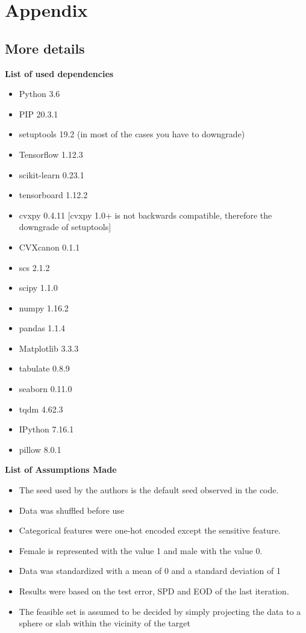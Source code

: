 \newpage
\section*{Appendix}
\subsection*{More details}

\textbf{List of used dependencies}
\begin{itemize}
    \item Python 3.6
    \item PIP 20.3.1
    \item setuptools 19.2 (in most of the cases you have to downgrade)
    \item Tensorflow 1.12.3
    \item scikit-learn 0.23.1
    \item tensorboard 1.12.2
    \item cvxpy 0.4.11 [cvxpy 1.0+ is not backwards compatible, therefore the downgrade of setuptools]
    \item CVXcanon 0.1.1
    \item scs 2.1.2
    \item scipy 1.1.0
    \item numpy 1.16.2
    \item pandas 1.1.4
    \item Matplotlib 3.3.3
    \item tabulate 0.8.9
    \item seaborn 0.11.0
    \item tqdm 4.62.3
    \item IPython 7.16.1
    \item pillow 8.0.1
\end{itemize}

\textbf{List of Assumptions Made}
\begin{itemize}
    \item The seed used by the authors is the default seed observed in the code.
    \item Data was shuffled before use
    \item Categorical features were one-hot encoded except the sensitive feature.
    \item Female is represented with the value 1 and male with the value 0.
    \item Data was standardized with a mean of 0 and a standard deviation of 1
    \item Results were based on the test error, SPD and EOD of the last iteration.
    \item The feasible set is assumed to be decided by simply projecting the data to a sphere or slab within the vicinity of the target
\end{itemize}

